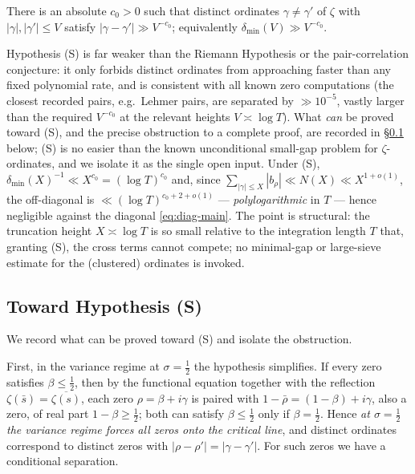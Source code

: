\begin{hypothesis}\label{hyp:spacing}
There is an absolute $c_0>0$ such that distinct ordinates $\gamma\ne\gamma'$ of
$\zeta$ with $|\gamma|,|\gamma'|\le V$ satisfy $|\gamma-\gamma'|\gg V^{-c_0}$;
equivalently $\delta_{\min}(V)\gg V^{-c_0}$.
\end{hypothesis}

\noindent
Hypothesis (S) is far weaker than the Riemann Hypothesis or the pair-correlation
conjecture: it only forbids distinct ordinates from approaching faster than any
fixed polynomial rate, and is consistent with all known zero computations
(the closest recorded pairs, e.g.\ Lehmer pairs, are separated by $\gg 10^{-5}$,
vastly larger than the required $V^{-c_0}$ at the relevant heights $V\asymp\log T$).
What \emph{can} be proved toward (S), and the precise obstruction to a complete
proof, are recorded in \S\ref{subsec:toward-S} below; (S) is no easier than the
known unconditional small-gap problem for $\zeta$-ordinates, and we isolate it as
the single open input.  Under (S),
$\delta_{\min}(X)^{-1}\ll X^{c_0}=(\log T)^{c_0}$ and, since
$\sum_{|\gamma|\le X}|b_\rho|\ll N(X)\ll X^{1+o(1)}$, the off-diagonal is
$\ll(\log T)^{c_0+2+o(1)}$ --- \emph{polylogarithmic} in $T$ --- hence negligible
against the diagonal \eqref{eq:diag-main}.  The point is structural: the
truncation height $X\asymp\log T$ is so small relative to the integration length
$T$ that, granting (S), the cross terms cannot compete; no minimal-gap or
large-sieve estimate for the (clustered) ordinates is invoked.

\subsection{Toward Hypothesis (S)}\label{subsec:toward-S}

We record what can be proved toward (S) and isolate the obstruction.

First, in the variance regime at $\sigma=\tfrac12$ the hypothesis simplifies.
If every zero satisfies $\beta\le\tfrac12$, then by the functional equation
together with the reflection $\zeta(\bar s)=\overline{\zeta(s)}$, each zero
$\rho=\beta+i\gamma$ is paired with $1-\bar\rho=(1-\beta)+i\gamma$, also a zero, of
real part $1-\beta\ge\tfrac12$; both can satisfy $\beta\le\tfrac12$ only if
$\beta=\tfrac12$.  Hence \emph{at $\sigma=\tfrac12$ the variance regime forces
all zeros onto the critical line}, and distinct ordinates correspond to distinct
zeros with $|\rho-\rho'|=|\gamma-\gamma'|$.  For such zeros we have a conditional
separation.

